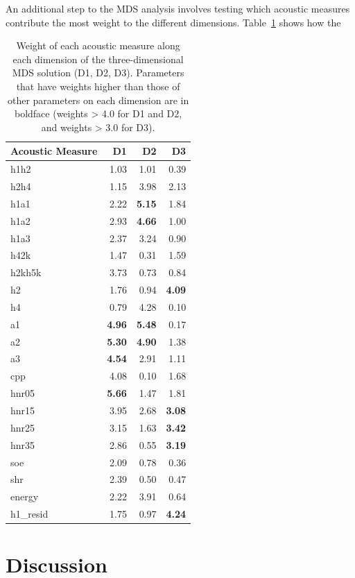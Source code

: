 An additional step to the MDS analysis involves testing which acoustic measures contribute the most weight to the different dimensions. Table~\ref{tab:acoustic_correlates} shows how the 

\begin{table}[ht]
    \centering
    \caption{Weight of each acoustic measure along each dimension of the three-dimensional MDS solution (D1, D2, D3). Parameters that have weights higher than those of other parameters on each dimension are in boldface (weights > 4.0 for D1 and D2, and weights > 3.0 for D3).} 
    \label{tab:acoustic_correlates}
    \begin{tabular}{lrrr}
    \hline
    Acoustic Measure & D1 & D2 & D3 \\ 
    \hline
    h1h2 & 1.03 & 1.01 & 0.39 \\ 
    h2h4 & 1.15 & 3.98 & 2.13 \\ 
    h1a1 & 2.22 & \textbf{5.15} & 1.84 \\ 
    h1a2 & 2.93 & \textbf{4.66} & 1.00 \\ 
    h1a3 & 2.37 & 3.24 & 0.90 \\ 
    h42k & 1.47 & 0.31 & 1.59 \\ 
    h2kh5k & 3.73 & 0.73 & 0.84 \\ 
    h2 & 1.76 & 0.94 & \textbf{4.09} \\ 
    h4 & 0.79 & 4.28 & 0.10 \\ 
    a1 & \textbf{4.96} & \textbf{5.48} & 0.17 \\ 
    a2 & \textbf{5.30} & \textbf{4.90} & 1.38 \\ 
    a3 & \textbf{4.54} & 2.91 & 1.11 \\ 
    cpp & 4.08 & 0.10 & 1.68 \\ 
    hnr05 & \textbf{5.66} & 1.47 & 1.81 \\ 
    hnr15 & 3.95 & 2.68 & \textbf{3.08} \\ 
    hnr25 & 3.15 & 1.63 & \textbf{3.42} \\ 
    hnr35 & 2.86 & 0.55 & \textbf{3.19} \\ 
    soe & 2.09 & 0.78 & 0.36 \\ 
    shr & 2.39 & 0.50 & 0.47 \\ 
    energy & 2.22 & 3.91 & 0.64 \\ 
    h1\_resid & 1.75 & 0.97 & \textbf{4.24} \\ 
    \hline
    \end{tabular}
\end{table}

\section{Discussion} \label{sec:acousticlandscape:discussion}
